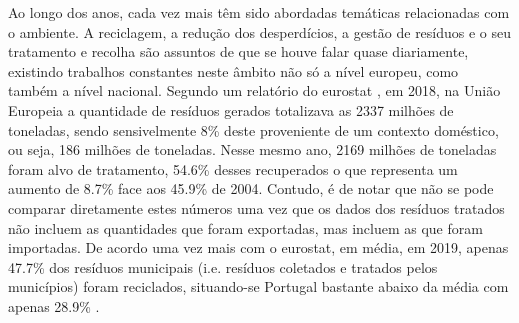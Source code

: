 \documentclass[11pt, a4paper, oneside]{book}
\begin{document}
Ao longo dos anos, cada vez mais têm sido abordadas temáticas relacionadas com o ambiente. A reciclagem, a redução dos desperdícios, a gestão de resíduos e o seu tratamento e recolha são assuntos de que se houve falar quase diariamente, existindo trabalhos constantes neste âmbito não só a nível europeu, como também a nível nacional.
Segundo um relatório do eurostat \cite{waste-generation-2018}, em 2018, na União Europeia a quantidade de resíduos gerados totalizava as 2337 milhões de toneladas, sendo sensivelmente 8\% deste proveniente de um contexto doméstico, ou seja, 186 milhões de toneladas. Nesse mesmo ano, 2169 milhões de toneladas foram alvo de tratamento, 54.6\% desses recuperados o que representa um aumento de 8.7\% face aos 45.9\% de 2004. Contudo, é de notar que não se pode comparar diretamente estes números uma vez que os dados dos resíduos tratados não incluem as quantidades que foram exportadas, mas incluem as que foram importadas.
De acordo uma vez mais com o eurostat, em média, em 2019, apenas 47.7\% dos resíduos municipais (i.e. resíduos coletados e tratados pelos municípios) foram reciclados, situando-se Portugal bastante abaixo da média com apenas 28.9\% \cite{recycling-municipal-waste}.

\nocite{*}

\clearpage
{}



\end{document}
